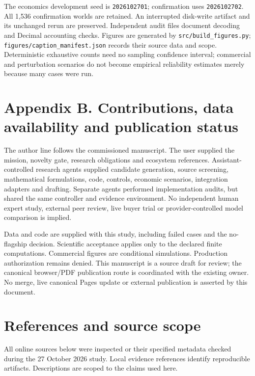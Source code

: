\documentclass[
  11pt,
]{article}
\begin{document}
The economics development seed is \texttt{2026102701}; confirmation uses
\texttt{2026102702}. All 1,536 confirmation worlds are retained. An
interrupted disk-write artifact and its unchanged rerun are preserved.
Independent audit files document decoding and Decimal accounting checks.
Figures are generated by \nolinkurl{src/build_figures.py};
\nolinkurl{figures/caption_manifest.json} records their source data and
scope. Deterministic exhaustive counts need no sampling confidence
interval; commercial and perturbation scenarios do not become empirical
reliability estimates merely because many cases were run.

\hypertarget{appendix-b.-contributions-data-availability-and-publication-status}{%
\section{Appendix B. Contributions, data availability and publication
status}\label{appendix-b.-contributions-data-availability-and-publication-status}}

The author line follows the commissioned manuscript. The user supplied
the mission, novelty gate, research obligations and ecosystem
references. Assistant-controlled research agents supplied candidate
generation, source screening, mathematical formulations, code, controls,
economic scenarios, integration adapters and drafting. Separate agents
performed implementation audits, but shared the same controller and
evidence environment. No independent human expert study, external peer
review, live buyer trial or provider-controlled model comparison is
implied.

Data and code are supplied with this study, including failed cases and
the no-flagship decision. Scientific acceptance applies only to the
declared finite computations. Commercial figures are conditional
simulations. Production authorization remains denied. This manuscript is
a source draft for review; the canonical browser/PDF publication route
is coordinated with the existing owner. No merge, live canonical Pages
update or external publication is asserted by this document.

\small
\hypertarget{references-and-source-scope}{%
\section{References and source
scope}\label{references-and-source-scope}}

All online sources below were inspected or their specified metadata
checked during the 27 October 2026 study. Local evidence references
identify reproducible artifacts. Descriptions are scoped to the claims
used here.
\end{document}
